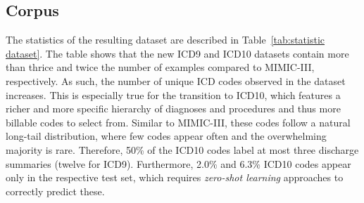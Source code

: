 \documentclass[11pt]{article}
\begin{document}
\subsection{Corpus}
The statistics of the resulting dataset are described in Table~\ref{tab:statistic dataset}. The table shows that the new ICD9 and ICD10 datasets contain more than thrice and twice the number of examples compared to MIMIC-III, respectively. As such, the number of unique ICD codes observed in the dataset increases. This is especially true for the transition to ICD10, which features a richer and more specific hierarchy of diagnoses and procedures and thus more billable codes to select from. Similar to MIMIC-III, these codes follow a natural long-tail distribution, where few codes appear often and the overwhelming majority is rare. Therefore, 50\% of the ICD10 codes label at most three discharge summaries (twelve for ICD9). Furthermore, 2.0\% and 6.3\% ICD10 codes appear only in the respective test set, which requires \emph{zero-shot learning} approaches to correctly predict these.
\end{document}

